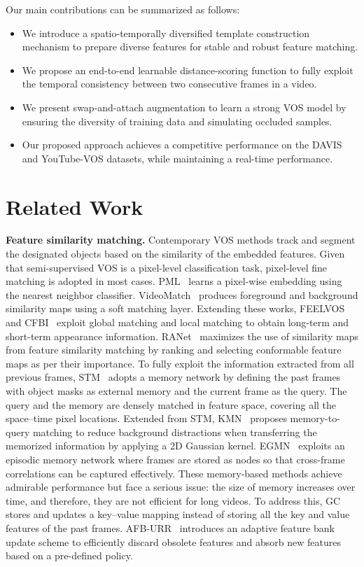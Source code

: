 \documentclass[runningheads]{llncs}
\begin{document}
Our main contributions can be summarized as follows:
\begin{itemize}[leftmargin=0.2in]
	\item We introduce a spatio-temporally diversified template construction mechanism to prepare diverse features for stable and robust feature matching. 
	
	\item We propose an end-to-end learnable distance-scoring function to fully exploit the temporal consistency between two consecutive frames in a video.
	
	\item We present swap-and-attach augmentation to learn a strong VOS model by ensuring the diversity of training data and simulating occluded samples. 
	
	\item Our proposed approach achieves a competitive performance on the DAVIS and YouTube-VOS datasets, while maintaining a real-time performance.
\end{itemize} 




\section{Related Work}
\noindent\textbf{Feature similarity matching.} Contemporary VOS methods track and segment the designated objects based on the similarity of the embedded features. Given that semi-supervised VOS is a pixel-level classification task, pixel-level fine matching is adopted in most cases. PML~\cite{PML} learns a pixel-wise embedding using the nearest neighbor classifier. VideoMatch~\cite{VideoMatch} produces foreground and background similarity maps using a soft matching layer. Extending these works, FEELVOS~\cite{FEELVOS} and CFBI~\cite{CFBI} exploit global matching and local matching to obtain long-term and short-term appearance information. RANet~\cite{RANet} maximizes the use of similarity maps from feature similarity matching by ranking and selecting conformable feature maps as per their importance. To fully exploit the information extracted from all previous frames, STM~\cite{STM} adopts a memory network by defining the past frames with object masks as external memory and the current frame as the query. The query and the memory are densely matched in feature space, covering all the space–time pixel locations. Extended from STM, KMN~\cite{KMN} proposes memory-to-query matching to reduce background distractions when transferring the memorized information by applying a 2D Gaussian kernel. EGMN~\cite{EGMN} exploits an episodic memory network where frames are stored as nodes so that cross-frame correlations can be captured effectively. These memory-based methods achieve admirable performance but face a serious issue: the size of memory increases over time, and therefore, they are not efficient for long videos. To address this, GC~\cite{GC} stores and updates a key–value mapping instead of storing all the key and value features of the past frames. AFB-URR~\cite{AFB-URR} introduces an adaptive feature bank update scheme to efficiently discard obsolete features and absorb new features based on a pre-defined policy. 
\end{document}
